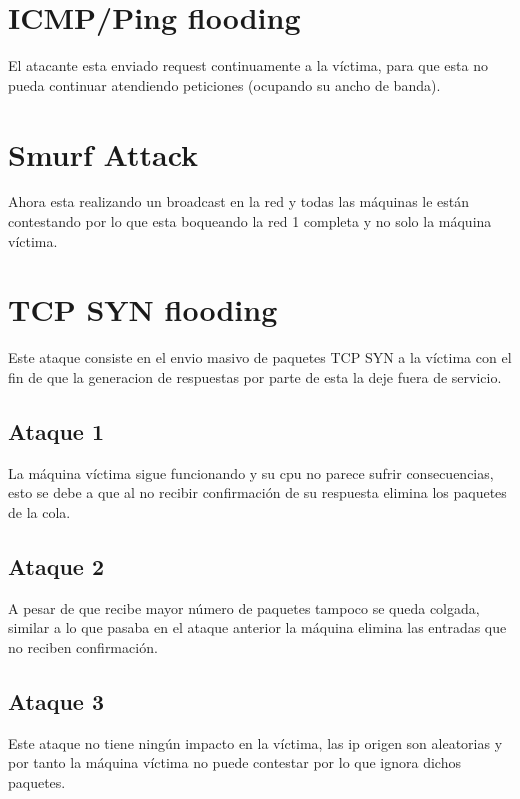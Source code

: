 \documentclass[11pt]{article}
\begin{document}
  \section{ICMP/Ping flooding}
    \par
    El atacante esta enviado request continuamente a la víctima, para que esta
    no pueda continuar atendiendo peticiones (ocupando su ancho de banda).

  \section{Smurf Attack}
    \par
    Ahora esta realizando un broadcast en la red y todas las máquinas le están
    contestando por lo que esta boqueando la red 1 completa y no solo la máquina
    víctima.

  \section{TCP SYN flooding}
    \par
    Este ataque consiste en el envio masivo de paquetes TCP SYN a la víctima con
    el fin de que la generacion de respuestas por parte de esta la deje fuera de
    servicio.

    \subsection{Ataque 1}
      \par
      La máquina víctima sigue funcionando y su cpu no parece sufrir
      consecuencias, esto se debe a que al no recibir confirmación de su
      respuesta elimina los paquetes de la cola.

    \subsection{Ataque 2}
      \par
      A pesar de que recibe mayor número de paquetes tampoco se queda colgada,
      similar a lo que pasaba en el ataque anterior la máquina elimina las
      entradas que no reciben confirmación.
    \subsection{Ataque 3}
      \par
      Este ataque no tiene ningún impacto en la víctima, las ip origen son
      aleatorias y por tanto la máquina víctima no puede contestar por lo que
      ignora dichos paquetes.
\end{document}
